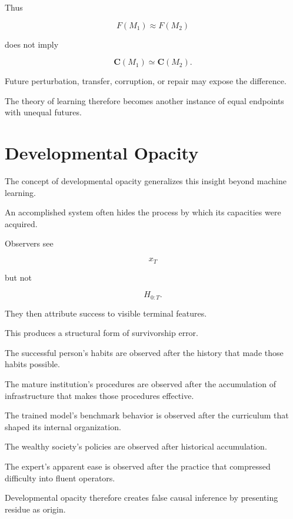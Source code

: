 \documentclass[11pt]{article}
\theoremstyle{remark}
\begin{document}
Thus

\begin{equation}
F(M_1)\approx F(M_2)
\end{equation}

does not imply

\begin{equation}
\mathbf{C}(M_1)\simeq\mathbf{C}(M_2).
\end{equation}

Future perturbation, transfer, corruption, or repair may expose the difference.

The theory of learning therefore becomes another instance of equal endpoints with unequal futures.

\section{Developmental Opacity}

The concept of developmental opacity generalizes this insight beyond machine learning.

An accomplished system often hides the process by which its capacities were acquired.

Observers see

\begin{equation}
x_T
\end{equation}

but not

\begin{equation}
H_{0:T}.
\end{equation}

They then attribute success to visible terminal features.

This produces a structural form of survivorship error.

The successful person's habits are observed after the history that made those habits possible.

The mature institution's procedures are observed after the accumulation of infrastructure that makes those procedures effective.

The trained model's benchmark behavior is observed after the curriculum that shaped its internal organization.

The wealthy society's policies are observed after historical accumulation.

The expert's apparent ease is observed after the practice that compressed difficulty into fluent operators.

Developmental opacity therefore creates false causal inference by presenting residue as origin.
\end{document}
